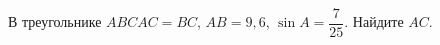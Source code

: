 \begin{ex}
	\begin{condition}
		В треугольнике \(ABC AC=BC\), \(AB=9,6\),  \( \sin A=\dfrac{7}{25} \).  Найдите \( AC \).
	\end{condition}
\end{ex}